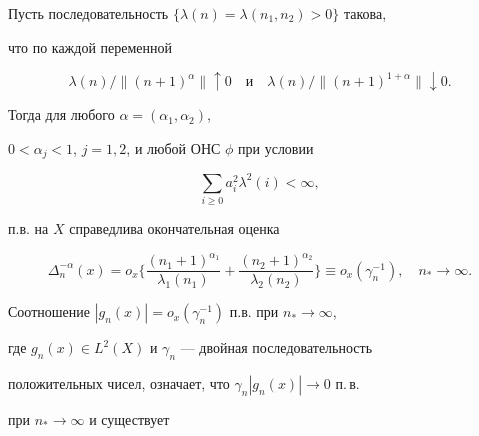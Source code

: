 \begin{thmnonum}


Пусть последовательность $ \{ \lambda (n)=\lambda (n_1,n_2)>0\}$ такова,


что по каждой переменной


\begin{equation}


\label{F3}


\lambda (n)/ \| (n+1)^\alpha \| \uparrow 0


\quad \text{и} \quad


\lambda (n)/ \| (n+1)^{1+\alpha }\| \downarrow 0.


\end{equation}





Тогда для любого $\alpha =(\alpha_1,\alpha_2)$,


$0<\alpha_j<1$, $j=1,2$, и любой ОНС $\phi $ при условии


\begin{equation}


\label{F5}


\sum_{i\ge 0} a_i^2 \lambda^2(i)< \infty,


\end{equation}


п.в. на $X$ справедлива окончательная оценка


\begin{equation}


\label{F6}


\Delta_n^{-\alpha }(x)=o_x \bigg\{ \frac{ (n_1+1)^{\alpha_1}}{\lambda_1(n_1)}+


\frac{(n_2+1)^{\alpha_2}}{\lambda_2(n_2)} \bigg\}\equiv o_x (\gamma_n^{-1}),


\quad n_* \to \infty.


\end{equation}


\end{thmnonum}





Соотношение $|g_n(x)|=o_x(\gamma_n^{-1})$ п.в. при $n_*\to \infty$, 


где $g_n(x) \in L^2(X)$ и $\gamma_n$ --- двойная последовательность 


положительных чисел, означает, что $ \gamma_n |g_n(x)| \to 0 $ п.\,в.


при $n_* \to \infty $ и существует


